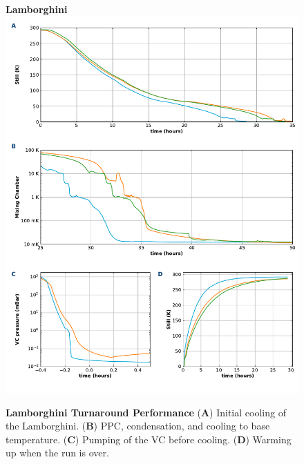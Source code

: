 \documentclass{article}[18pt,A4]
\begin{document}
\begin{figure}[t]
\centering
\textbf{\color{sectioncolor}Lamborghini}
\includegraphics{fig/lamb_performance.pdf}
\caption{\textbf{Lamborghini Turnaround Performance}
(\textbf{\color{sectioncolor}A}) Initial cooling of the Lamborghini.
(\textbf{\color{sectioncolor}B}) PPC, condensation, and cooling to base temperature.
(\textbf{\color{sectioncolor}C}) Pumping of the VC before cooling.
(\textbf{\color{sectioncolor}D}) Warming up when the run is over.
}
\end{figure}
\end{document}
